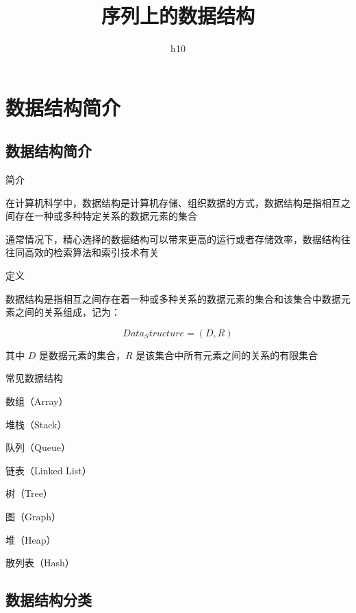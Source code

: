 \documentclass[UTF8]{beamer}
\title{序列上的数据结构}
\author{h10}
\begin{document}
	\begin{frame}

		\maketitle

	\end{frame}

	\section{数据结构简介}

		\subsection{数据结构简介}

			\begin{frame}{简介}

			在计算机科学中，数据结构是计算机存储、组织数据的方式，数据结构是指相互之间存在一种或多种特定关系的数据元素的集合

			通常情况下，精心选择的数据结构可以带来更高的运行或者存储效率，数据结构往往同高效的检索算法和索引技术有关

			\end{frame}

			\begin{frame}{定义}

			数据结构是指相互之间存在着一种或多种关系的数据元素的集合和该集合中数据元素之间的关系组成，记为：

			$$
			Data_Structure=(D,R)
			$$

			其中 $D$ 是数据元素的集合，$R$ 是该集合中所有元素之间的关系的有限集合

			\end{frame}

			\begin{frame}{常见数据结构}

			数组（Array）

			堆栈（Stack）

			队列（Queue）

			链表（Linked List）

			树（Tree）

			图（Graph）

			堆（Heap）

			散列表（Hash）

			\end{frame}

		\subsection{数据结构分类}
\end{document}
